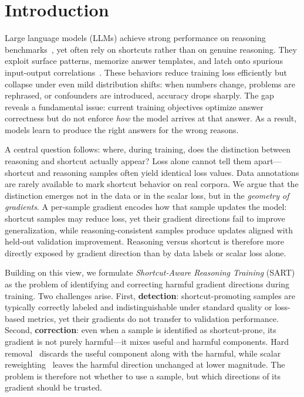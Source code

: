 \iffalse
\section{Introduction}

Large language models (LLMs) achieve strong performance on reasoning benchmarks~\cite{wei2022chain,wang2022self,kojima2022large}, yet often rely on shortcuts rather than on genuine reasoning. They exploit surface patterns, memorize answer templates, and latch onto spurious input-output correlations~\cite{geirhos2020shortcut,mccoy2019right,niven2019probing}. These behaviors reduce training loss efficiently but collapse under even mild distribution shifts: when numbers change, problems are rephrased, or confounders are introduced, accuracy drops sharply. The gap reveals a fundamental issue: current training objectives optimize answer correctness but do not enforce \emph{how} the model arrives at that answer. As a result, models learn to produce the right answers for the wrong reasons.

A central question follows: where, during training, does the distinction between reasoning and shortcut actually appear? Loss alone cannot tell them apart---shortcut and reasoning samples often yield identical loss values. Data annotations are rarely available to mark shortcut behavior on real corpora. We argue that the distinction emerges not in the data or in the scalar loss, but in the \emph{geometry of gradients}. A per-sample gradient encodes how that sample updates the model: shortcut samples may reduce loss, yet their gradient directions fail to improve generalization, while reasoning-consistent samples produce updates aligned with held-out validation improvement. Reasoning versus shortcut is therefore more directly exposed by gradient direction than by data labels or scalar loss alone.

Building on this view, we formulate \emph{Shortcut-Aware Reasoning Training} (SART) as the problem of identifying and correcting harmful gradient directions during training. Two challenges arise. First, \textbf{detection}: shortcut-promoting samples are typically correctly labeled and indistinguishable under standard quality or loss-based metrics, yet their gradients do not transfer to validation performance. Second, \textbf{correction}: even when a sample is identified as shortcut-prone, its gradient is not purely harmful---it mixes useful and harmful components. Hard removal~\cite{koh2020understandingblackboxpredictionsinfluence} discards the useful component along with the harmful, while scalar reweighting~\cite{lin2018focallossdenseobject,liu2021justtraintwiceimproving} leaves the harmful direction unchanged at lower magnitude. The problem is therefore not whether to use a sample, but which directions of its gradient should be trusted.

